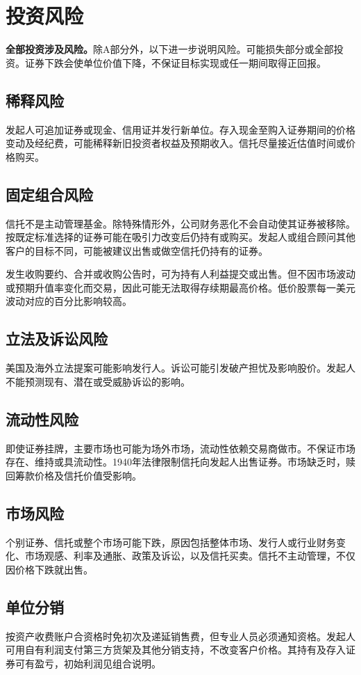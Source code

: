 \documentclass[UTF8,fontset=none,11pt,a4paper]{ctexart}
\begin{document}
\section*{投资风险}
\textbf{全部投资涉及风险。}除A部分外，以下进一步说明风险。可能损失部分或全部投资。证券下跌会使单位价值下降，不保证目标实现或任一期间取得正回报。


\subsection*{稀释风险}
发起人可追加证券或现金、信用证并发行新单位。存入现金至购入证券期间的价格变动及经纪费，可能稀释新旧投资者权益及预期收入。信托尽量接近估值时间或价格购买。


\subsection*{固定组合风险}
信托不是主动管理基金。除特殊情形外，公司财务恶化不会自动使其证券被移除。按既定标准选择的证券可能在吸引力改变后仍持有或购买。发起人或组合顾问其他客户的目标不同，可能被建议出售或做空信托仍持有的证券。


发生收购要约、合并或收购公告时，可为持有人利益提交或出售。但不因市场波动或预期升值率变化而交易，因此可能无法取得存续期最高价格。低价股票每一美元波动对应的百分比影响较高。


\subsection*{立法及诉讼风险}
美国及海外立法提案可能影响发行人。诉讼可能引发破产担忧及影响股价。发起人不能预测现有、潜在或受威胁诉讼的影响。


\subsection*{流动性风险}
即使证券挂牌，主要市场也可能为场外市场，流动性依赖交易商做市。不保证市场存在、维持或具流动性。1940年法律限制信托向发起人出售证券。市场缺乏时，赎回筹款价格及信托价值受影响。


\subsection*{市场风险}
个别证券、信托或整个市场可能下跌，原因包括整体市场、发行人或行业财务变化、市场观感、利率及通胀、政策及诉讼，以及信托买卖。信托不主动管理，不仅因价格下跌就出售。


\subsection*{单位分销}
按资产收费账户合资格时免初次及递延销售费，但专业人员必须通知资格。发起人可用自有利润支付第三方货架及其他分销支持，不改变客户价格。其持有及存入证券可有盈亏，初始利润见组合说明。
\end{document}
